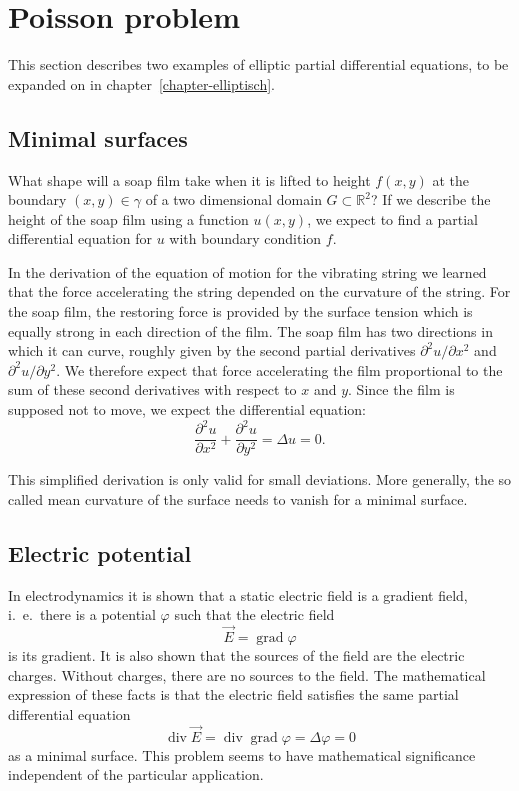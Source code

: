 %
%
%
\section{Poisson problem}
\label{poisson-problem}
This section describes two examples of elliptic partial differential
equations, to be expanded on in chapter~\ref{chapter-elliptisch}.

\subsection{Minimal surfaces\label{beispiele:minimal surfaces}}
What shape will a soap film take when it is lifted to height
$f(x,y)$ at the boundary $(x,y)\in\gamma$ of 
a two dimensional domain $G\subset \mathbb R^2$?
If we describe the height of the soap film using a function
$u(x,y)$, we expect to find a partial differential equation for $u$
with boundary condition $f$.

In the derivation of the equation of motion for the vibrating string
we learned that the force accelerating the string depended on the
curvature of the string.
For the soap film, the restoring force is provided by the surface
tension which is equally strong in each direction of the film.
The soap film has two directions in which it can curve, roughly
given by the second partial derivatives $\partial^2 u/\partial x^2$ and
$\partial^2 u/\partial y^2$.
We therefore expect that force accelerating the film proportional
to the sum of these second derivatives with respect to $x$ and $y$.
Since the film is supposed not to move, we expect the differential
equation:
\[
\frac{\partial^2 u }{\partial x^2}+\frac{\partial^2 u }{\partial y^2}
=\Delta u =0.
\]

This simplified derivation is only valid for small deviations.
More generally, the so called mean curvature of the surface needs
to vanish for a minimal surface.

\subsection{Electric potential}
In electrodynamics it is shown that a static electric field is a 
gradient field, i.~e.~there is a potential $\varphi$ such that the
electric field
\[
\vec E=\operatorname{grad}\varphi
\]
is its gradient.
It is also shown that the sources of the field are the electric charges.
Without charges, there are no sources to the field.
The mathematical expression of these facts is that 
the electric field satisfies the same partial differential equation
\[
\operatorname{div}\vec E=\operatorname{div}\operatorname{grad}\varphi
=\Delta \varphi=0
\]
as a minimal surface.
This problem seems to have mathematical significance independent of the
particular application.

